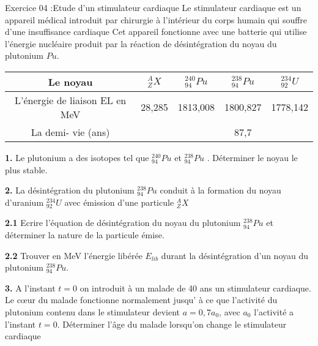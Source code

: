 \documentclass[12pt, french]{article}
\begin{document}
\begin{Box2}{Exercice 04 :Etude d’un stimulateur cardiaque}
Le stimulateur cardiaque est un appareil médical introduit par chirurgie à l’intérieur du corps
humain qui souffre d’une insuffisance cardiaque Cet appareil fonctionne avec une batterie qui utilise
l’énergie nucléaire produit par la réaction de désintégration du noyau du plutonium $Pu$.
\begin{center}

\begin{tabular}{ |c|c|c|c|c| }
	\hline
Le noyau & $^A_ZX$ & $^{240}_{94}Pu$ & $^{238}_{94}Pu$ & $^{234}_{92}U$\\\hline
L’énergie de liaison EL en MeV &
28,285 &1813,008 &1800,827& 1778,142\\\hline
La demi- vie (ans)&
				  &  & 87,7&  \\\hline
\end{tabular}
\end{center}

\textbf{1. } Le plutonium a des isotopes tel que $^{240}_{94}Pu$ et $^{238}_{94}Pu$ . Déterminer le noyau le plus stable.

\textbf{2. } La désintégration du plutonium $^{238}_{94}Pu$ conduit à la formation du noyau d’uranium $^{234}_{92}U$ avec
émission d’une particule $^A_ZX$

\textbf{2.1 } Ecrire l’équation de désintégration du noyau du plutonium $^{238}_{94}Pu$ et déterminer la nature de la
particule émise.

\textbf{2.2 } Trouver en MeV l’énergie libérée $E_{lib}$ durant la désintégration d’un noyau du plutonium $^{238}_{94}Pu$.

\textbf{3. }A l’instant $t=0$ on introduit à un malade de 40 ans un stimulateur cardiaque. Le cœur du malade
fonctionne normalement jusqu’ à ce que l’activité du plutonium contenu dans le stimulateur
devient $a=0,7a_0$, avec $a_0$ l’activité a l’instant $t = 0$. Déterminer l’âge du malade lorsqu’on change
le stimulateur cardiaque
\end{Box2}
\end{document}
